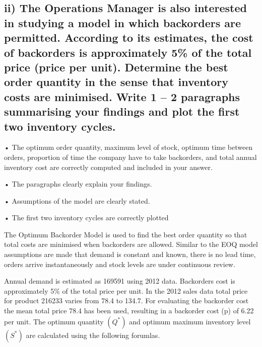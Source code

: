 \documentclass[
  11pt,
]{article}
\begin{document}
\hypertarget{ii-the-operations-manager-is-also-interested-in-studying-a-model-in-which-backorders-are-permitted.-according-to-its-estimates-the-cost-of-backorders-is-approximately-5-of-the-total-price-price-per-unit.-determine-the-best-order-quantity-in-the-sense-that-inventory-costs-are-minimised.-write-1-2-paragraphs-summarising-your-findings-and-plot-the-first-two-inventory-cycles.}{%
\subsection{ii) The Operations Manager is also interested in studying a
model in which backorders are permitted. According to its estimates, the
cost of backorders is approximately 5\% of the total price (price per
unit). Determine the best order quantity in the sense that inventory
costs are minimised. Write 1 -- 2 paragraphs summarising your findings
and plot the first two inventory
cycles.}\label{ii-the-operations-manager-is-also-interested-in-studying-a-model-in-which-backorders-are-permitted.-according-to-its-estimates-the-cost-of-backorders-is-approximately-5-of-the-total-price-price-per-unit.-determine-the-best-order-quantity-in-the-sense-that-inventory-costs-are-minimised.-write-1-2-paragraphs-summarising-your-findings-and-plot-the-first-two-inventory-cycles.}}

• The optimum order quantity, maximum level of stock, optimum time
between orders, proportion of time the company have to take backorders,
and total annual inventory cost are correctly computed and included in
your answer.

• The paragraphs clearly explain your findings.

• Assumptions of the model are clearly stated.

• The first two inventory cycles are correctly plotted

The Optimum Backorder Model is used to find the best order quantity so
that total costs are minimised when backorders are allowed. Similar to
the EOQ model assumptions are made that demand is constant and known,
there is no lead time, orders arrive instantaneously and stock levels
are under continuous review.

Annual demand is estimated as 169591 using 2012 data. Backorders cost is
approximately 5\% of the total price per unit. In the 2012 sales data
total price for product 216233 varies from 78.4 to 134.7. For evaluating
the backorder cost the mean total price 78.4 has been used, resulting in
a backorder cost (p) of 6.22 per unit. The optimum quantity \((Q^*)\)
and optimum maximum inventory level \((S^*)\) are calculated using the
following forumlas.
\end{document}
